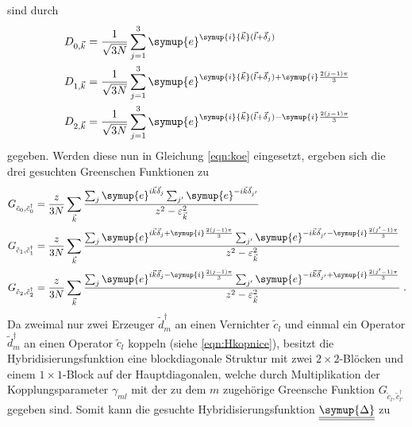 sind durch
\begin{equation}
    \begin{aligned}
    D_{0,\vec{k}} &= \frac{1}{\sqrt{3N}}\sum_{j=1}^3\symup{e}^{\symup{i}{\vec{k}}(\vec{l}+\vec{\delta}_j)} \\
    D_{1,\vec{k}} &= \frac{1}{\sqrt{3N}}\sum_{j=1}^3\symup{e}^{\symup{i}{\vec{k}}(\vec{l}+\vec{\delta}_j)+\symup{i}\frac{2(j-1)\pi}{3}}  \\
    D_{2,\vec{k}} &= \frac{1}{\sqrt{3N}}\sum_{j=1}^3\symup{e}^{\symup{i}{\vec{k}}(\vec{l}+\vec{\delta}_j)-\symup{i}\frac{2(j-1)\pi}{3}}  \label{eqn:fourierko}
    \end{aligned}    
\end{equation}
gegeben.
Werden diese nun in Gleichung \eqref{eqn:koe} eingesetzt, ergeben sich die drei gesuchten Greenschen Funktionen zu 
\begin{equation}
    \begin{aligned}
    G_{\tilde{c}_0, \tilde{c}^\dagger_0} &= \frac{z}{3N} \sum_{\vec{k}} \frac{\sum_j \symup{e}^{i{\vec{k}}\vec{\delta}_j} \sum_{j'} \symup{e}^{-i{\vec{k}}\vec{\delta}_{j'}}                                                            }{z^2-\varepsilon_{\vec{k}}^2} \\
    G_{\tilde{c}_1, \tilde{c}^\dagger_1} &= \frac{z}{3N} \sum_{\vec{k}} \frac{\sum_j \symup{e}^{i{\vec{k}}\vec{\delta}_j+\symup{i}\frac{2(j-1)\pi}{3}} \sum_{j'} \symup{e}^{-i{\vec{k}}\vec{\delta}_{j'}-\symup{i}\frac{2(j'-1)\pi}{3}} }{z^2-\varepsilon_{\vec{k}}^2} \\
    G_{\tilde{c}_2, \tilde{c}^\dagger_2} &= \frac{z}{3N} \sum_{\vec{k}} \frac{\sum_j \symup{e}^{i{\vec{k}}\vec{\delta}_j-\symup{i}\frac{2(j-1)\pi}{3}} \sum_{j'} \symup{e}^{-i{\vec{k}}\vec{\delta}_{j'}+\symup{i}\frac{2(j'-1)\pi}{3}} }{z^2-\varepsilon_{\vec{k}}^2} \; .
    \end{aligned}
\end{equation}
Da zweimal nur zwei Erzeuger $\tilde{d}_m^{\dagger}$ an einen Vernichter $\tilde{c}_l$ und einmal ein Operator $\tilde{d}_m^{\dagger}$ an einen Operator $\tilde{c}_l$ koppeln
(siehe \eqref{eqn:Hkopnice}), 
besitzt die Hybridisierungsfunktion
eine blockdiagonale Struktur mit zwei $2 \times 2$-Blöcken und einem $1 \times 1$-Block auf der Hauptdiagonalen, welche 
durch Multiplikation der Kopplungsparameter $\gamma_{ml}$ mit der zu dem $m$ zugehörige Greensche Funktion $G_{\tilde{c}_l, \tilde{c}^\dagger_{l'}}$ gegeben sind.
Somit kann die gesuchte Hybridisierungsfunktion $\underline{\underline{\symup{\Delta}}}$ zu

